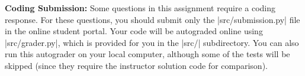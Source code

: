 {\bf Coding Submission:}
Some questions in this assignment require a coding response.  For these questions, you should submit only the |src/submission.py| file in the online student portal.  Your code will be
autograded online using |src/grader.py|, which is provided for you in the |src/|
subdirectory. You can also run this autograder on your local computer, although some of the tests will be skipped (since they
require the instructor solution code for comparison).
